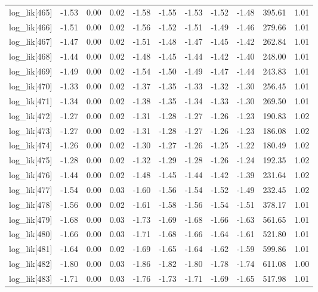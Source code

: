 \begin{table}[ht]
\begin{tabular}{rrrrrrrrrrr}
  log\_lik[465] & -1.53 & 0.00 & 0.02 & -1.58 & -1.55 & -1.53 & -1.52 & -1.48 & 395.61 & 1.01 \\ 
  log\_lik[466] & -1.51 & 0.00 & 0.02 & -1.56 & -1.52 & -1.51 & -1.49 & -1.46 & 279.66 & 1.01 \\ 
  log\_lik[467] & -1.47 & 0.00 & 0.02 & -1.51 & -1.48 & -1.47 & -1.45 & -1.42 & 262.84 & 1.01 \\ 
  log\_lik[468] & -1.44 & 0.00 & 0.02 & -1.48 & -1.45 & -1.44 & -1.42 & -1.40 & 248.00 & 1.01 \\ 
  log\_lik[469] & -1.49 & 0.00 & 0.02 & -1.54 & -1.50 & -1.49 & -1.47 & -1.44 & 243.83 & 1.01 \\ 
  log\_lik[470] & -1.33 & 0.00 & 0.02 & -1.37 & -1.35 & -1.33 & -1.32 & -1.30 & 256.45 & 1.01 \\ 
  log\_lik[471] & -1.34 & 0.00 & 0.02 & -1.38 & -1.35 & -1.34 & -1.33 & -1.30 & 269.50 & 1.01 \\ 
  log\_lik[472] & -1.27 & 0.00 & 0.02 & -1.31 & -1.28 & -1.27 & -1.26 & -1.23 & 190.83 & 1.02 \\ 
  log\_lik[473] & -1.27 & 0.00 & 0.02 & -1.31 & -1.28 & -1.27 & -1.26 & -1.23 & 186.08 & 1.02 \\ 
  log\_lik[474] & -1.26 & 0.00 & 0.02 & -1.30 & -1.27 & -1.26 & -1.25 & -1.22 & 180.49 & 1.02 \\ 
  log\_lik[475] & -1.28 & 0.00 & 0.02 & -1.32 & -1.29 & -1.28 & -1.26 & -1.24 & 192.35 & 1.02 \\ 
  log\_lik[476] & -1.44 & 0.00 & 0.02 & -1.48 & -1.45 & -1.44 & -1.42 & -1.39 & 231.64 & 1.02 \\ 
  log\_lik[477] & -1.54 & 0.00 & 0.03 & -1.60 & -1.56 & -1.54 & -1.52 & -1.49 & 232.45 & 1.02 \\ 
  log\_lik[478] & -1.56 & 0.00 & 0.02 & -1.61 & -1.58 & -1.56 & -1.54 & -1.51 & 378.17 & 1.01 \\ 
  log\_lik[479] & -1.68 & 0.00 & 0.03 & -1.73 & -1.69 & -1.68 & -1.66 & -1.63 & 561.65 & 1.01 \\ 
  log\_lik[480] & -1.66 & 0.00 & 0.03 & -1.71 & -1.68 & -1.66 & -1.64 & -1.61 & 521.80 & 1.01 \\ 
  log\_lik[481] & -1.64 & 0.00 & 0.02 & -1.69 & -1.65 & -1.64 & -1.62 & -1.59 & 599.86 & 1.01 \\ 
  log\_lik[482] & -1.80 & 0.00 & 0.03 & -1.86 & -1.82 & -1.80 & -1.78 & -1.74 & 611.08 & 1.00 \\ 
  log\_lik[483] & -1.71 & 0.00 & 0.03 & -1.76 & -1.73 & -1.71 & -1.69 & -1.65 & 517.98 & 1.01 \\ 

\end{tabular}
\end{table}
